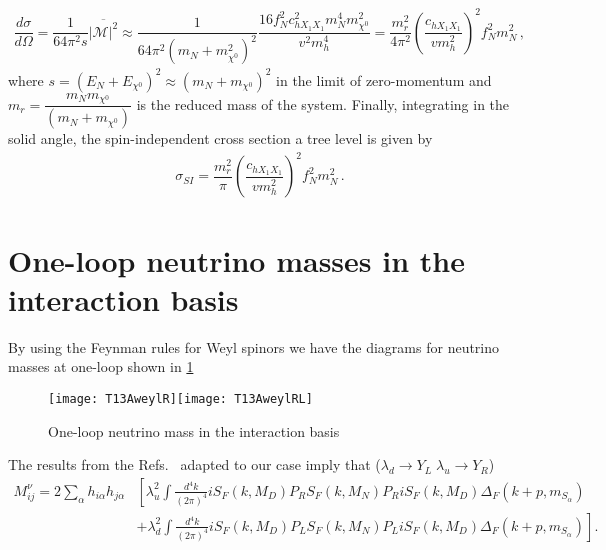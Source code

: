 \begin{align}
\dfrac{d\sigma}{d\Omega}=\dfrac{1}{64\pi^2 s}\overline{|\mathcal{M}|^2}
\approx\dfrac{1}{64\pi^2 (m_N+m_{\chi^0}^2)^2}\dfrac{16f_N^2c_{hX_1X_1}^2m_N^4m_{\chi^0}^2}{v^2m_h^4}
=\dfrac{m_r^2}{4\pi^2}\left(\dfrac{c_{hX_1X_1}}{vm_h^2}\right)^2f_N^2m_N^2\,,
\end{align}
where $s=(E_N+E_{\chi^0})^2\approx(m_N+m_{\chi^0})^2$ in the limit of zero-momentum and $m_r=\dfrac{m_Nm_{\chi^0}}{(m_N+m_{\chi^0})}$ is the reduced mass of the system.
%
Finally, integrating in the solid angle, the spin-independent cross section a tree level is given by
\begin{align}
\label{eq:SI-tree-level}
\sigma_{SI}=\dfrac{m_r^2}{\pi}\left(\dfrac{c_{hX_1X_1}}{vm_h^2}\right)^2f_N^2m_N^2\,.
\end{align}
% 












\section{One-loop neutrino masses in the interaction basis}
\label{sec:mass-interaction-basis}

By using the Feynman rules for Weyl spinors we have the diagrams for
neutrino masses at one-loop shown in \ref{fig:t13aweyl}
%
\begin{figure}[h]
  \centering
\texttt{[image: T13AweylR]}\qquad \texttt{[image: T13AweylRL]}
  \caption{One-loop neutrino mass in the interaction basis}
  \label{fig:t13aweyl}
\end{figure}

The results from the Refs.~\cite{Bonnet:2012kz,Suematsu:2010nd} adapted to our case imply that ($\lambda_d \to Y_L\; \lambda_u \to Y_R$)
\begin{align}
  M^{\nu}_{ij}=2\sum_{\alpha}h_{i\alpha}h_{j\alpha} &\left[  \lambda_u^2\int \frac{d^4 k}{(2\pi)^4}i S_F \left(k,M_D \right)P_R S_F \left(k,M_N \right)P_R i S_F \left(k,M_D \right)
             \Delta_F \left( k+p,m_{S_\alpha} \right)\right. \nonumber\\
          &\left.+\lambda_d^2\int \frac{d^4 k}{(2\pi)^4}i S_F \left(k,M_D \right)P_L S_F \left(k,M_N \right)P_L i S_F \left(k,M_D \right)
             \Delta_F \left( k+p,m_{S_\alpha} \right) 
            \right].
\end{align}


